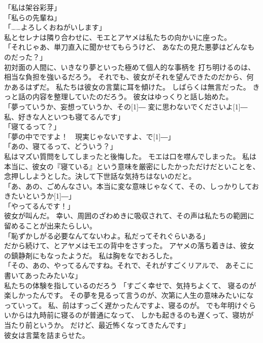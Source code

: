 \documentclass[../IHMain]{subfiles}
\begin{document}
「私は架谷彩芽」\\
「私らの先輩ね」\\
「……よろしくおねがいします」\\
私とセレナは隣り合わせに、モエとアヤメは私たちの向かいに座った。\\
「それじゃあ、単刀直入に聞かせてもらうけど、
あなたの見た悪夢はどんなものだった？」\\
初対面の人間に、いきなり夢といった極めて個人的な事柄を
打ち明けるのは、相当な負担を強いるだろう。
それでも、彼女がそれを望んできたのだから、何かあるはずだ。
私たちは彼女の言葉に耳を傾けた。
しばらくは無言だった。
きっと話の内容を整理していたのだろう。
彼女はゆっくりと話し始めた。\\
「夢っていうか、妄想っていうか、その\scalebox{3}[1]{―}
変に思わないでくださいよ\scalebox{3}[1]{―}私、好きな人といつも寝てるんです」\\
「寝てるって？」\\
「夢の中でですよ！　現実じゃないですよ、で\scalebox{3}[1]{―}」\\
「あの、寝てるって、どういう？」\\
私はマズい質問をしてしまったと後悔した。
モエは口を噤んでしまった。
私は本当に、彼女の『寝ている』という意味を厳密にしたかっただけだといことを、
念押ししようとした。決して下世話な気持ちはないのだと。\\
「あ、あの、ごめんなさい。本当に変な意味じゃなくて、その、しっかりしておきたいというか\scalebox{3}[1]{―}」\\
「やってるんです！」\\
彼女が叫んだ。
幸い、周囲のざわめきに吸収されて、その声は私たちの範囲に留めることが出来たらしい。\\
「恥ずかしがる必要なんてないわよ。私だってそれぐらいある」\\
だから続けて、とアヤメはモエの背中をさすった。
アヤメの落ち着きは、彼女の鎮静剤にもなったようだ。
私は胸をなでおろした。\\
「その、あの、やってるんですね。それで、それがすごくリアルで、
あそこに書いてあったみたいな」\\
私たちの体験を指しているのだろう
「すごく幸せで、気持ちよくて、
寝るのが楽しかったんです。
その夢を見るって言うのが、次第に人生の意味みたいになっていって。
私、前はすっごく遅かったんですよ、寝るのが。
でも年明けぐらいからは九時前に寝るのが普通になって、
しかも起きるのも遅くって、寝坊が当たり前というか。
だけど、最近怖くなってきたんです」\\
彼女は言葉を詰まらせた。\\
\end{document}
